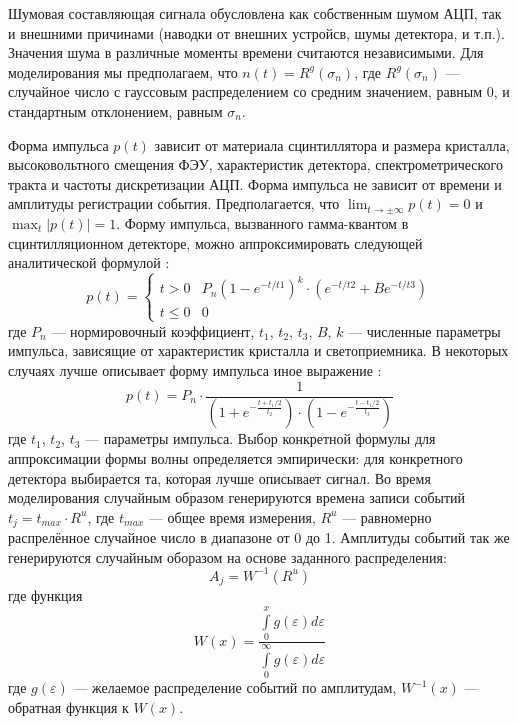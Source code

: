 Шумовая составляющая сигнала обусловлена как собственным шумом АЦП, так и внешними причинами (наводки от внешних устройсв, шумы детектора, и т.п.). Значения шума в различные моменты времени считаются независимыми. Для моделирования мы предполагаем, что $n(t) = R^g( \sigma_n )$, где $R^g(\sigma_n)$ --- случайное число с гауссовым распределением со средним значением, равным 0, и стандартным отклонением, равным $\sigma_n$.

Форма импульса $p(t)$ зависит от материала сцинтиллятора и размера кристалла, высоковольтного смещения ФЭУ, характеристик детектора, спектрометрического тракта и частоты дискретизации АЦП. Форма импульса не зависит от времени и амплитуды регистрации события. Предполагается, что $\lim_{t \to \pm \infty} p(t) = 0$ и $\max_{t} | p(t)| = 1$. Форму импульса, вызванного гамма-квантом в сцинтилляционном детекторе, можно аппроксимировать следующей аналитической формулой \cite{Gin2008,Shevelev2004,Shevelev2016,Khilkevitch2020}:
\begin{equation}
  \label{eq:PulseShape}
  p(t) = \begin{cases} 
    t > 0   & P_n \left( 1 - e^{-t/t1} \right)^k \cdot \left( e^{-t/t2} + B e^{-t/t3} \right) \\ 
            t \le 0 & 0
         \end{cases}
\end{equation}
где $P_n$ --- нормировочный коэффициент, $t_1$, $t_2$, $t_3$, $B$, $k$ --- численные параметры импульса, зависящие от характеристик кристалла и светоприемника. В некоторых случаях лучше описывает форму импульса иное выражение \cite{Khilkevitch2020}: 
\begin{equation*}
  p(t) = P_n \cdot \frac{1}{ \left( 1 + e^{-\frac{t + t_1/2}{t_2}} \right) \cdot \left( 1 - e^{-\frac{t - t_1/2}{t_3}} \right) }
\end{equation*}
где $t_1$, $t_2$, $t_3$ --- параметры импульса. Выбор конкретной формулы для аппроксимации формы волны определяется эмпирически: для конкретного детектора выбирается та, которая лучше описывает сигнал. Во время моделирования случайным образом генерируются времена записи событий $t_j = t_{max} \cdot R^u$, где  $t_{max}$ --- общее время измерения, $R^u$ --- равномерно распрелённое случайное число в диапазоне от 0 до 1. Амплитуды событий так же генерируются случайным оборазом на основе заданного распределения:
\begin{equation*}
  A_j = W^{-1}(R^u)
\end{equation*}
где функция
\begin{equation*}
  W(x) = \frac{ \int\limits_0^{x} g(\varepsilon) d\varepsilon }{ \int\limits_0^{\infty} g(\varepsilon) d\varepsilon }
\end{equation*}
где $g(\varepsilon)$ --- желаемое распределение событий по амплитудам, $W^{-1}(x)$ --- обратная функция к $W(x)$.


